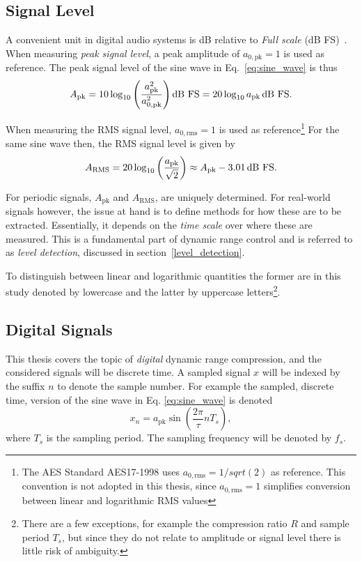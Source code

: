 \documentclass[../main2.tex]{subfiles}
\begin{document}
\subsection{Signal Level}
A convenient unit in digital audio systems is dB relative to \emph{Full scale} (dB FS)~\cite{db_fullscale}. When measuring \emph{peak signal level}, a peak amplitude of $a_{0, \text{pk}} = 1$ is used as reference. The peak signal level of the sine wave in Eq.~\eqref{eq:sine_wave} is thus
\begin{equation}
A_\text{pk} = 10 \log_{10} \left( \frac{a_\text{pk}^2}{a_{0, \text{pk}}^2} \right) \text{dB FS} = 20 \log_{10} a_\text{pk} \mskip3mu\text{dB FS}.
\end{equation}

When measuring the RMS signal level, $a_{0, \text{rms}} = 1$ is used as reference\footnote{The  AES Standard AES17-1998 uses $a_{0, \text{rms}} = 1/sqrt(2)$ as reference. This convention is not adopted in this thesis, since $a_{0, \text{rms}} = 1$ simplifies conversion between linear and logarithmic RMS values}
For the same sine wave then, the RMS signal level is given by
\begin{equation}
A_\text{RMS} = 20\log_{10} \left( \frac{a_\text{pk}}{\sqrt 2} \right) \approx A_\text{pk}- 3.01 \mskip3mu\text{dB FS}.
\end{equation}

For periodic signals, $A_\text{pk}$ and $A_\text{RMS}$, are uniquely determined. For real-world signals however, the issue at hand is to define methods for how these are to be extracted. Essentially, it depends on the \emph{time scale} over where these are measured. This is a fundamental part of dynamic range control and is referred to as \emph{level detection}, discussed in section~\ref{level_detection}. 

To distinguish between linear and logarithmic quantities the former are in this study denoted by lowercase and the latter by uppercase letters\footnote{There are a few exceptions, for example the compression ratio $R$ and sample period $T_s$, but since they do not relate to amplitude or signal level there is little risk of ambiguity.}.

\subsection{Digital Signals}
This thesis covers the topic of \emph{digital} dynamic range compression, and the considered signals will be discrete time. A sampled signal $x$ will be indexed by the suffix $n$ to denote the sample number. For example the sampled, discrete time, version of the sine wave in Eq. \eqref{eq:sine_wave} is denoted
\begin{equation}
x_n = a_\text{pk} \sin \left( \frac{2 \pi}{\tau} n T_s \right),
\end{equation}
where $T_s$ is the sampling period. The sampling frequency will be denoted by $f_s$.
\end{document}
